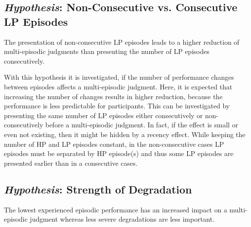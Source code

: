 \subsection[H3: Non-Consecutive vs. Consecutive \acs{LP} Episodes]{\emph{Hypothesis}: Non-Consecutive vs. Consecutive \acs{LP} Episodes}
\begin{hypothesis}\label{hypo:consecutive}
The presentation of non-consecutive \ac{LP} episodes leads to a higher reduction of multi-episodic judgments than presenting the number of \ac{LP} episodes consecutively.
\end{hypothesis}

With this hypothesis it is investigated, if the number of performance changes between episodes affects a multi-episodic judgment.
Here, it is expected that increasing the number of changes results in higher reduction, because the performance is less predictable for participants.
This can be investigated by presenting the same number of \ac{LP} episodes either consecutively or non-consecutively before a multi-episodic judgment.
In fact, if the effect is small or even not existing, then it might be hidden by a recency effect.
While keeping the number of \ac{HP} and \ac{LP} episodes constant, in the non-consecutive cases \ac{LP} episodes must be separated by \ac{HP} episode(s) and thus some \ac{LP} episodes are presented earlier than in a consecutive cases.

\subsection[H4: Strength of Degradation]{\emph{Hypothesis}: Strength of Degradation}
\begin{hypothesis}\label{hypo:strength}
The lowest experienced episodic performance has an increased impact on a multi-episodic judgment whereas less severe degradations are less important.
\end{hypothesis}

